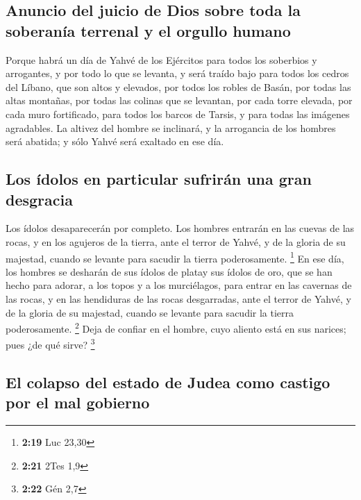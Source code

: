 \hypertarget{anuncio-del-juicio-de-dios-sobre-toda-la-soberanuxeda-terrenal-y-el-orgullo-humano}{%
\subsection{Anuncio del juicio de Dios sobre toda la soberanía terrenal
y el orgullo
humano}\label{anuncio-del-juicio-de-dios-sobre-toda-la-soberanuxeda-terrenal-y-el-orgullo-humano}}

 Porque habrá un día de Yahvé de los Ejércitos para todos
los soberbios y arrogantes, y por todo lo que se levanta, y será traído
bajo  para todos los cedros del Líbano, que son altos y
elevados, por todos los robles de Basán,  por todas las
altas montañas, por todas las colinas que se levantan, 
por cada torre elevada, por cada muro fortificado,  para
todos los barcos de Tarsis, y para todas las imágenes agradables.
 La altivez del hombre se inclinará, y la arrogancia de
los hombres será abatida; y sólo Yahvé será exaltado en ese día.

\hypertarget{los-uxeddolos-en-particular-sufriruxe1n-una-gran-desgracia}{%
\subsection{Los ídolos en particular sufrirán una gran
desgracia}\label{los-uxeddolos-en-particular-sufriruxe1n-una-gran-desgracia}}

 Los ídolos desaparecerán por completo. 
Los hombres entrarán en las cuevas de las rocas, y en los agujeros de la
tierra, ante el terror de Yahvé, y de la gloria de su majestad, cuando
se levante para sacudir la tierra poderosamente. \footnote{\textbf{2:19}
  Luc 23,30}  En ese día, los hombres se desharán de sus
ídolos de platay sus ídolos de oro, que se han hecho para adorar, a los
topos y a los murciélagos,  para entrar en las cavernas
de las rocas, y en las hendiduras de las rocas desgarradas, ante el
terror de Yahvé, y de la gloria de su majestad, cuando se levante para
sacudir la tierra poderosamente. \footnote{\textbf{2:21} 2Tes 1,9}
 Deja de confiar en el hombre, cuyo aliento está en sus
narices; pues ¿de qué sirve? \footnote{\textbf{2:22} Gén 2,7}

\hypertarget{el-colapso-del-estado-de-judea-como-castigo-por-el-mal-gobierno}{%
\subsection{El colapso del estado de Judea como castigo por el mal
gobierno}\label{el-colapso-del-estado-de-judea-como-castigo-por-el-mal-gobierno}}

